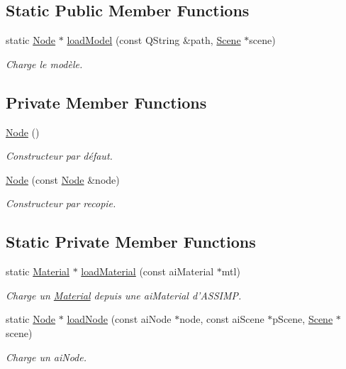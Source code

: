 \subsection*{Static Public Member Functions}
\begin{DoxyCompactItemize}
\item 
static \hyperlink{class_node}{Node} $\ast$ \hyperlink{class_node_ac2140ddf8f06f8b5620e6743c945c482}{load\+Model} (const Q\+String \&path, \hyperlink{class_scene}{Scene} $\ast$scene)
\begin{DoxyCompactList}\small\item\em Charge le modèle. \end{DoxyCompactList}\end{DoxyCompactItemize}
\subsection*{Private Member Functions}
\begin{DoxyCompactItemize}
\item 
\hyperlink{class_node_ad7a34779cad45d997bfd6d3d8043c75f}{Node} ()
\begin{DoxyCompactList}\small\item\em Constructeur par défaut. \end{DoxyCompactList}\item 
\hyperlink{class_node_a4bf5930c1238505203c3dcf6e4573bad}{Node} (const \hyperlink{class_node}{Node} \&node)
\begin{DoxyCompactList}\small\item\em Constructeur par recopie. \end{DoxyCompactList}\end{DoxyCompactItemize}
\subsection*{Static Private Member Functions}
\begin{DoxyCompactItemize}
\item 
static \hyperlink{class_material}{Material} $\ast$ \hyperlink{class_node_a0684a35524cc1e276bfefdd28cd452cf}{load\+Material} (const ai\+Material $\ast$mtl)
\begin{DoxyCompactList}\small\item\em Charge un \hyperlink{class_material}{Material} depuis une ai\+Material d'A\+S\+S\+I\+M\+P. \end{DoxyCompactList}\item 
static \hyperlink{class_node}{Node} $\ast$ \hyperlink{class_node_acf6db74c5840b203f4eee1239539ce31}{load\+Node} (const ai\+Node $\ast$node, const ai\+Scene $\ast$p\+Scene, \hyperlink{class_scene}{Scene} $\ast$scene)
\begin{DoxyCompactList}\small\item\em Charge un ai\+Node. \end{DoxyCompactList}\end{DoxyCompactItemize}

